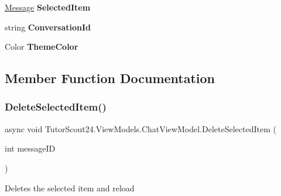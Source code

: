 \begin{DoxyCompactItemize}
\mbox{\hyperlink{class_tutor_scout24_1_1_models_1_1_chat_1_1_message}{Message}} {\bfseries Selected\+Item}
\item 
\mbox{\label{class_tutor_scout24_1_1_view_models_1_1_chat_view_model_a252746c3bf69ebe011ed9023b8acd3e3}} 
string {\bfseries Conversation\+Id}
\item 
\mbox{\label{class_tutor_scout24_1_1_view_models_1_1_chat_view_model_af93ff2eaaf62c8ee2b5645ee6a9608e9}} 
Color {\bfseries Theme\+Color}
\end{DoxyCompactItemize}


\subsection{Member Function Documentation}
\mbox{\label{class_tutor_scout24_1_1_view_models_1_1_chat_view_model_a7e4aeb5984779594082267c2158eec89}} 
\subsubsection{\texorpdfstring{Delete\+Selected\+Item()}{DeleteSelectedItem()}}
{\footnotesize\ttfamily async void Tutor\+Scout24.\+View\+Models.\+Chat\+View\+Model.\+Delete\+Selected\+Item (\begin{DoxyParamCaption}\item[{int}]{message\+ID }\end{DoxyParamCaption})\hspace{0.3cm}{\ttfamily [inline]}}



Deletes the selected item and reload 



